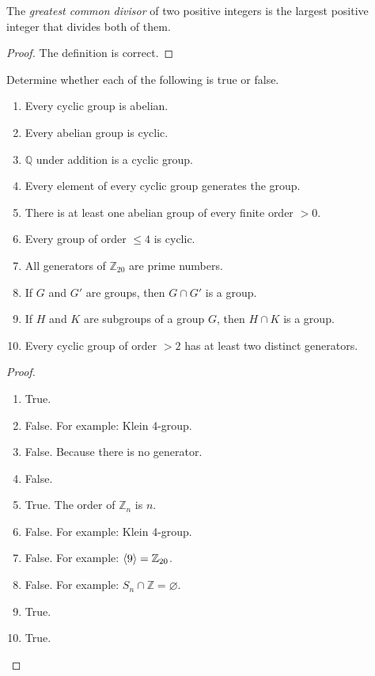 \newpage
\begin{exercise}
    The \textit{greatest common divisor} of two positive integers is the largest positive integer that divides both of them.
\end{exercise}

\begin{proof}
    The definition is correct.
\end{proof}

\newpage
\begin{exercise}
    Determine whether each of the following is true or false.
    \begin{enumerate}[label={\textbf{\alph*.}}]
        \item Every cyclic group is abelian.
        \item Every abelian group is cyclic.
        \item $\mathbb{Q}$ under addition is a cyclic group.
        \item Every element of every cyclic group generates the group.
        \item There is at least one abelian group of every finite order $> 0$.
        \item Every group of order $\leq 4$ is cyclic.
        \item All generators of $\mathbb{Z}_{20}$ are prime numbers.
        \item If $G$ and $G'$ are groups, then $G\cap G'$ is a group.
        \item If $H$ and $K$ are subgroups of a group $G$, then $H\cap K$ is a group.
        \item Every cyclic group of order $> 2$ has at least two distinct generators.
    \end{enumerate}
\end{exercise}

\begin{proof}
    \begin{enumerate}[label={\textbf{\alph*.}}]
        \item True.
        \item False. For example: Klein 4-group.
        \item False. Because there is no generator.
        \item False.
        \item True. The order of $\mathbb{Z}_{n}$ is $n$.
        \item False. For example: Klein 4-group.
        \item False. For example: $\left\langle{9}\right\rangle = \mathbb{Z}_{20}$.
        \item False. For example: $S_{n} \cap \mathbb{Z} = \varnothing$.
        \item True.
        \item True.
    \end{enumerate}
\end{proof}


